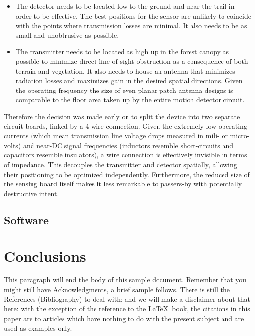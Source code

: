 \documentclass[10pt,nocopyrightspace]{ewsn-proc}
\begin{document}
\begin{itemize}
\item The detector needs to be located low to the ground and near the trail in order to be effective. The best positions for the sensor are unlikely to coincide with the points where transmission losses are minimal.  It also needs to be as small and unobtrusive as possible.
\item The transmitter needs to be located as high up in the forest canopy as possible to minimize direct line of sight obstruction as a consequence of both terrain and vegetation. It also needs to house an antenna that minimizes radiation losses and maximizes gain in the desired spatial directions. Given the operating frequency the size of even planar patch antenna designs is comparable to the floor area taken up by the entire motion detector circuit.
\end{itemize}

Therefore the decision was made early on to split the device into two separate circuit boards, linked by a 4-wire connection. Given the extremely low operating currents (which mean transmission line voltage drops measured in mili- or micro- volts) and near-DC signal frequencies (inductors resemble short-circuits and capacitors resemble insulators), a wire connection is effectively invisible in terms of impedance. This decouples the transmitter and detector spatially, allowing their positioning to be optimized independently. Furthermore, the reduced size of the sensing board itself makes it less remarkable to passers-by with potentially destructive intent.


\subsection{Software}


\section{Conclusions}
This paragraph will end the body of this sample document.
Remember that you might still have Acknowledgments, a brief sample
follows.  There is still the References (Bibliography) to deal with; and
we will make a disclaimer about that here: with the exception
of the reference to the \LaTeX\ book, the citations in
this paper are to articles which have nothing to
do with the present subject and are used as
examples only.

\newpage

%
%
\end{document}

